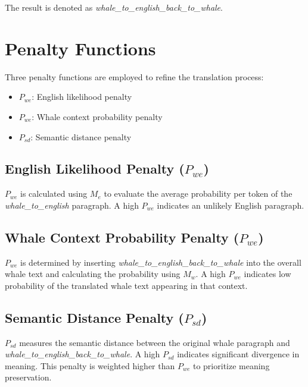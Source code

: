 \documentclass{article}
\begin{document}
The result is denoted as \textit{whale\_to\_english\_back\_to\_whale}.

\section{Penalty Functions}
Three penalty functions are employed to refine the translation process:

\begin{itemize}
    \item $P_{we}$: English likelihood penalty
    \item $P_{we}$: Whale context probability penalty
    \item $P_{sd}$: Semantic distance penalty
\end{itemize}
\subsection{English Likelihood Penalty (\texorpdfstring{\(P_{we}\)}{Pwe})}
$P_{we}$ is calculated using $M_e$ to evaluate the average probability per token of the \textit{whale\_to\_english} paragraph. A high $P_{we}$ indicates an unlikely English paragraph.

\subsection{Whale Context Probability Penalty (\texorpdfstring{\(P_{we}\)}{Pwew})}

$P_{we}$ is determined by inserting \textit{whale\_to\_english\_back\_to\_whale} into the overall whale text and calculating the probability using $M_w$. A high $P_{we}$ indicates low probability of the translated whale text appearing in that context.

\subsection{Semantic Distance Penalty (\texorpdfstring{\(P_{sd}\)}{Psd})}
$P_{sd}$ measures the semantic distance between the original whale paragraph and \textit{whale\_to\_english\_back\_to\_whale}. A high $P_{sd}$ indicates significant divergence in meaning. This penalty is weighted higher than $P_{we}$ to prioritize meaning preservation.
\end{document}
